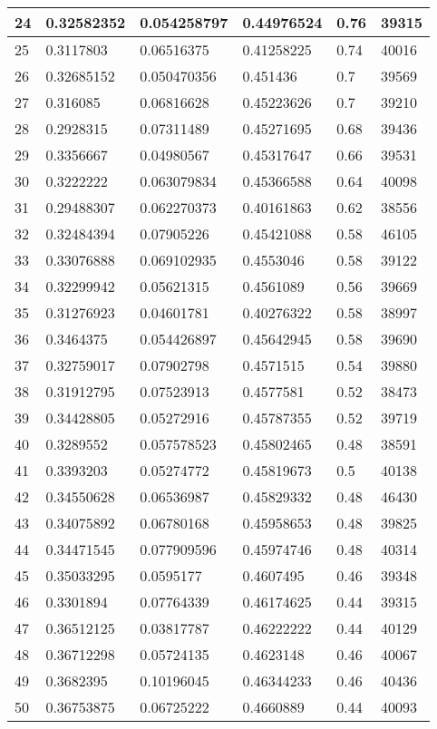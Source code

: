 \begin{longtable}{|l|l|l|l|l|l|}
24 & 0.32582352 & 0.054258797 & 0.44976524 & 0.76 & 39315 \\ \hline 
25 & 0.3117803 & 0.06516375 & 0.41258225 & 0.74 & 40016 \\ \hline 
26 & 0.32685152 & 0.050470356 & 0.451436 & 0.7 & 39569 \\ \hline 
27 & 0.316085 & 0.06816628 & 0.45223626 & 0.7 & 39210 \\ \hline 
28 & 0.2928315 & 0.07311489 & 0.45271695 & 0.68 & 39436 \\ \hline 
29 & 0.3356667 & 0.04980567 & 0.45317647 & 0.66 & 39531 \\ \hline 
30 & 0.3222222 & 0.063079834 & 0.45366588 & 0.64 & 40098 \\ \hline 
31 & 0.29488307 & 0.062270373 & 0.40161863 & 0.62 & 38556 \\ \hline 
32 & 0.32484394 & 0.07905226 & 0.45421088 & 0.58 & 46105 \\ \hline 
33 & 0.33076888 & 0.069102935 & 0.4553046 & 0.58 & 39122 \\ \hline 
34 & 0.32299942 & 0.05621315 & 0.4561089 & 0.56 & 39669 \\ \hline 
35 & 0.31276923 & 0.04601781 & 0.40276322 & 0.58 & 38997 \\ \hline 
36 & 0.3464375 & 0.054426897 & 0.45642945 & 0.58 & 39690 \\ \hline 
37 & 0.32759017 & 0.07902798 & 0.4571515 & 0.54 & 39880 \\ \hline 
38 & 0.31912795 & 0.07523913 & 0.4577581 & 0.52 & 38473 \\ \hline 
39 & 0.34428805 & 0.05272916 & 0.45787355 & 0.52 & 39719 \\ \hline 
40 & 0.3289552 & 0.057578523 & 0.45802465 & 0.48 & 38591 \\ \hline 
41 & 0.3393203 & 0.05274772 & 0.45819673 & 0.5 & 40138 \\ \hline 
42 & 0.34550628 & 0.06536987 & 0.45829332 & 0.48 & 46430 \\ \hline 
43 & 0.34075892 & 0.06780168 & 0.45958653 & 0.48 & 39825 \\ \hline 
44 & 0.34471545 & 0.077909596 & 0.45974746 & 0.48 & 40314 \\ \hline 
45 & 0.35033295 & 0.0595177 & 0.4607495 & 0.46 & 39348 \\ \hline 
46 & 0.3301894 & 0.07764339 & 0.46174625 & 0.44 & 39315 \\ \hline 
47 & 0.36512125 & 0.03817787 & 0.46222222 & 0.44 & 40129 \\ \hline 
48 & 0.36712298 & 0.05724135 & 0.4623148 & 0.46 & 40067 \\ \hline 
49 & 0.3682395 & 0.10196045 & 0.46344233 & 0.46 & 40436 \\ \hline 
50 & 0.36753875 & 0.06725222 & 0.4660889 & 0.44 & 40093 \\ \hline 
\end{longtable}